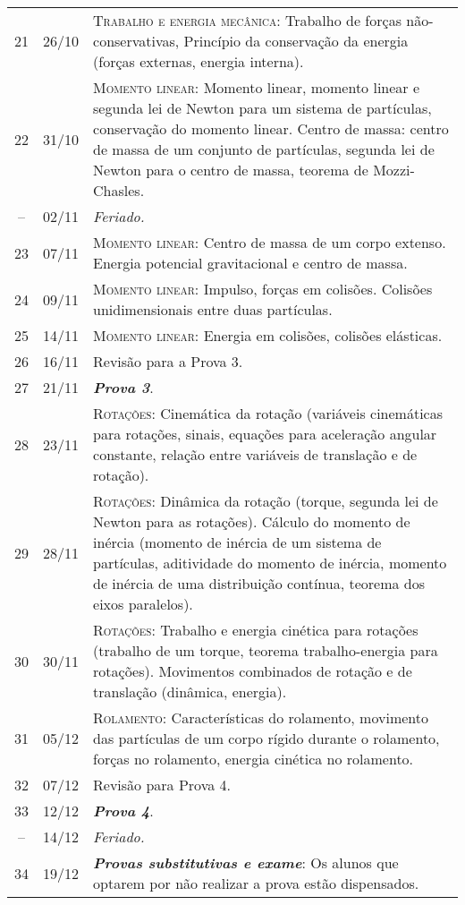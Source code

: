 \begin{center}
\begin{longtable}{ccp{70mm}}
21	 & 	26/10	 & 	\textsc{Trabalho e energia mecânica:} Trabalho de forças não-conservativas, Princípio da conservação da energia (forças externas, energia interna). \\
22	 & 	31/10	 & 	\textsc{Momento linear:} Momento linear, momento linear e segunda lei de Newton para um sistema de partículas, conservação do momento linear. Centro de massa: centro de massa de um conjunto de partículas, segunda lei de Newton para o centro de massa, teorema de Mozzi-Chasles. \\
--   &  02/11    & \emph{Feriado.} \\
23	 & 	07/11	 & 	\textsc{Momento linear:} Centro de massa de um corpo extenso. Energia potencial gravitacional e centro de massa. \\
24	 & 	09/11	 & 	\textsc{Momento linear:} Impulso, forças em colisões. Colisões unidimensionais entre duas partículas. \\
25	 & 	14/11	 & 	\textsc{Momento linear:} Energia em colisões, colisões elásticas. \\
26	 & 	16/11	 & 	Revisão para a Prova 3. \\
27	 & 	21/11	 & 	\textbf{\textit{Prova 3}}. \\
28	 &  23/11	 & 	\textsc{Rotações:} Cinemática da rotação (variáveis cinemáticas para rotações, sinais, equações para aceleração angular constante, relação entre variáveis de translação e de rotação). \\
29	 & 	28/11	 & 	\textsc{Rotações:} Dinâmica da rotação (torque, segunda lei de Newton para as rotações). Cálculo do momento de inércia (momento de inércia de um sistema de partículas, aditividade do momento de inércia, momento de inércia de uma distribuição contínua, teorema dos eixos paralelos). \\
30	 & 	30/11	 & 	\textsc{Rotações:} Trabalho e energia cinética para rotações (trabalho de um torque, teorema trabalho-energia para rotações). Movimentos combinados de rotação e de translação (dinâmica, energia). \\
31	 & 	05/12	 & 	\textsc{Rolamento:} Características do rolamento, movimento das partículas de um corpo rígido durante o rolamento, forças no rolamento, energia cinética no rolamento. \\
32	 & 	07/12	 & 	Revisão para Prova 4. \\
33	 & 	12/12	 & 	\textbf{\textit{Prova 4}}. \\
--   &  14/12    &  \emph{Feriado.} \\
34	 & 	19/12	 & 	\textbf{\textit{Provas substitutivas e exame}}: Os alunos que optarem por não realizar a prova estão dispensados. \\
\end{longtable}
\end{center}


\cleardoublepage

